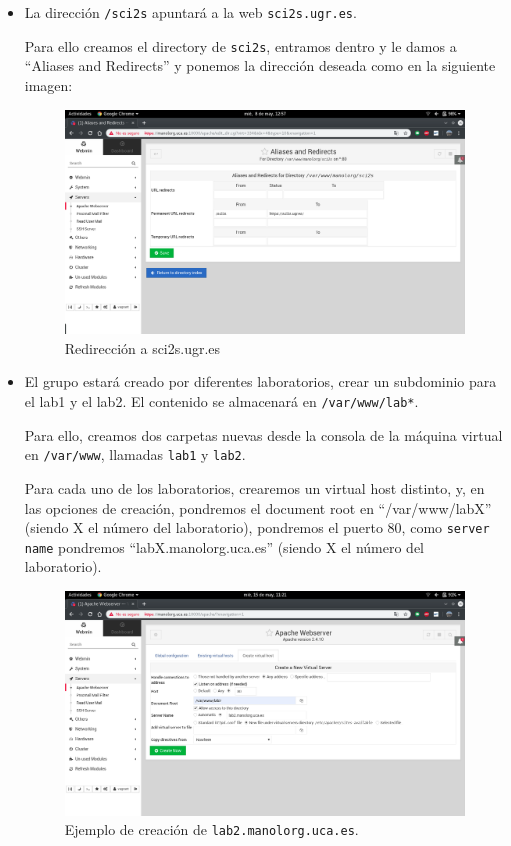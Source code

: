 \documentclass[12pt,letterpaper]{article}
\begin{document}
\begin{itemize}
	\item La dirección \texttt{/sci2s} apuntará a la web \texttt{sci2s.ugr.es}.
	
	Para ello creamos el directory de \texttt{sci2s}, entramos dentro y le damos a ``Aliases and Redirects'' y ponemos la dirección deseada como en la siguiente imagen:
	\newpage
	\begin{figure}[h]
		\centering
		\includegraphics[scale=0.34]{ugr.png}
		\caption{Redirección a sci2s.ugr.es}
		\label{Redirección a sci2s.ugr.es}
	\end{figure}
	
	\item El grupo estará creado por diferentes laboratorios, crear un subdominio para el lab1 y el lab2. El contenido se almacenará en \texttt{/var/www/lab*}.
	
	Para ello, creamos dos carpetas nuevas desde la consola de la máquina virtual en \texttt{/var/www}, llamadas \texttt{lab1} y \texttt{lab2}.
	
	Para cada uno de los laboratorios, crearemos un virtual host distinto, y, en las opciones de creación, pondremos el document root en ``/var/www/labX'' (siendo X el número del laboratorio), pondremos el puerto 80, como \texttt{server name} pondremos ``labX.manolorg.uca.es'' (siendo X el número del laboratorio).
	
	\newpage
	\begin{figure}[h]
		\centering
		\includegraphics[scale=0.34]{CrearLab.png}
		\caption{Ejemplo de creación de \texttt{lab2.manolorg.uca.es}.}
		\label{Ejemplo de creación de lab2.manolorg.uca.es}
	\end{figure}
	

\end{itemize}
\end{document}
